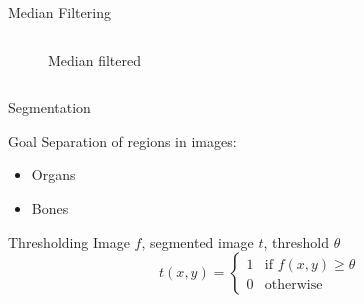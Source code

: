 \begin{frame}[c]{Median Filtering}
\begin{columns}[c,onlytextwidth]
\begin{column}{0.45\textwidth}
\begin{figure}[]
                \caption{Median filtered}%
                \label{fig:name}
            \end{figure}
        \end{column}
    \end{columns}
\end{frame}

\begin{frame}[c]{Segmentation}
    \begin{block}{Goal}
        Separation of regions in images:
        \begin{itemize}
            \item Organs
            \item Bones
        \end{itemize}
    \end{block}
    \begin{block}{Thresholding}
        Image $f$, segmented image $t$, threshold $\theta$
        \begin{equation*}
            t(x,y) =
            \begin{cases}
                1 & \mbox{if } f(x,y)\geq \theta \\
                0 & \mbox{otherwise}
            \end{cases}
        \end{equation*}
    \end{block}
\end{frame}

